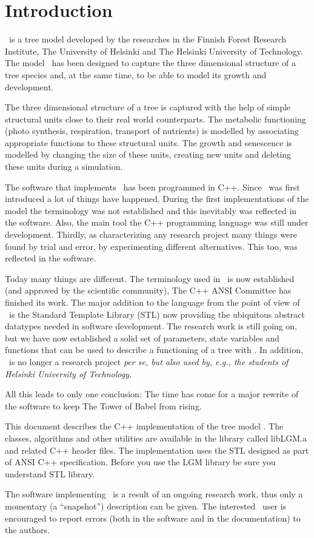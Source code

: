 \section{Introduction}

\lignum\ is a tree model developed by the researches 
in the Finnish Forest Research Institute, The University of Helsinki
and The Helsinki University of Technology.
The model \lignum\ has been designed to capture the three dimensional
structure of a tree species and, at the same time, to be able 
to model its growth and development.

The three dimensional structure of a tree is captured with the
help of simple structural units close to their real
world counterparts. The metabolic functioning (photo synthesis, 
respiration, transport of nutrients) is modelled by associating 
appropriate functions to these structural units. The
growth and senescence is modelled by changing the size 
of these units, creating new units and deleting these units
during a simulation.

The software that implements \lignum\ has been programmed in C++. 
Since \lignum\ was first introduced \cite{salminen:omt94, perttunen:aob96} a lot
of things have happened. During the first implementations of the model 
the terminology was not established and this inevitably
was reflected  in the software. Also, the main tool the C++ 
programming language was still under development. 
Thirdly, as characterizing any
research project many things were found by trial and error, by 
experimenting different alternatives. This too, was reflected in the software.

Today many things are different. The terminology used in \lignum\
is now established (and approved by the scientific community), 
The C++ ANSI Committee has finished its work. 
The major addition to the language from the
point of view of \lignum\ is the Standard Template Library (STL)
now providing the ubiquitous abstract datatypes needed in
software development. The research
work is still going on, but we have now established a solid set of
parameters, state variables and functions that can be
used to describe a functioning of a tree with \lignum. In addition,
\lignum\ is no longer a research project \it per se\rm, but also
used by, e.g., the students of Helsinki University of Technology.

All this leads to only one conclusion: The time has come for
a major rewrite of the software to keep The Tower of Babel from rising.       

This document describes the C++ implementation of the tree model \linebreak
\lignum. The classes, algorithms and other utilities are available in the
library called libLGM.a and related C++ header files. The
implementation uses the STL designed 
as part of ANSI C++ specification.  Before  you use the LGM library
be sure you understand STL library.

The software implementing \lignum\ is a result of an ongoing
research work, thus only a momentary (a ``snapshot'') description
can be given. The interested \lignum\ user is encouraged to report
errors (both in the software and in the documentation) to the authors. 

